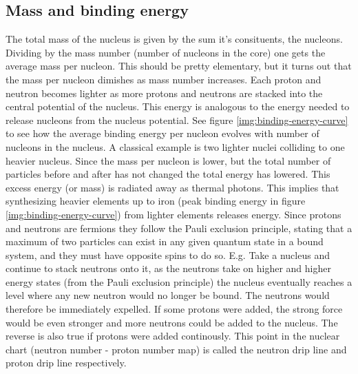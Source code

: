 \subsection{Mass and binding energy} \label{sec:binding-energy}
The total mass of the nucleus is given by the sum it's consituents, the nucleons.
Dividing by the mass number (number of nucleons in the core) one gets the average mass per nucleon.
This should be pretty elementary, but it turns out that the mass per nucleon dimishes
as mass number increases. Each proton and neutron becomes lighter as more protons and neutrons are stacked
into the central potential of the nucleus.
This energy is analogous to the energy needed to release nucleons from the nucleus potential.
See figure \ref{img:binding-energy-curve} to see how the average binding energy per nucleon evolves with number of nucleons in the nucleus.
\noindent
A classical example is two lighter nuclei colliding to one heavier nucleus. Since
the mass per nucleon is lower, but the total number of particles before and after has not changed the total
energy has lowered. This excess energy (or mass) is radiated away as thermal photons.
This implies that synthesizing heavier elements up to iron (peak binding energy in figure \ref{img:binding-energy-curve}) from
lighter elements releases energy.
Since protons and neutrons are fermions they follow the Pauli exclusion principle,
stating that a maximum of two particles can exist in any given quantum state in a bound system, and they must have opposite spins to do so.
\noindent
E.g. Take a nucleus and continue to stack neutrons onto it, as the neutrons take on
higher and higher energy states (from the Pauli exclusion principle) the nucleus eventually reaches
a level where any new neutron would no longer be bound. The neutrons would therefore be immediately expelled.
If some protons were added, the strong force would be even stronger and more neutrons could be
added to the nucleus. The reverse is also true if protons were added continously.
This point in the nuclear chart (neutron number - proton number map) is called the neutron drip line
and proton drip line respectively.
\begin{figure}[h]
    
\end{figure}
\FloatBarrier

